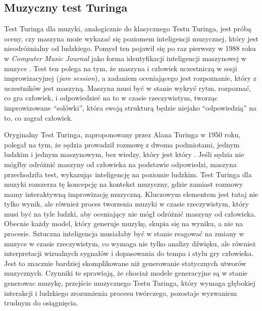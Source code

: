 \documentclass[data-science]{agh-wi} %
\begin{document}
\subsection{Muzyczny test Turinga}
Test Turinga dla muzyki, analogicznie do klasycznego Testu Turinga, jest próbą oceny, czy maszyna może wykazać się poziomem inteligencji muzycznej, który jest nieodróżnialny od ludzkiego. Pomysł ten pojawił się po raz pierwszy w 1988 roku w \textit{Computer Music Journal} jako forma identyfikacji inteligencji maszynowej w muzyce \cite{music_turing_test}. Test ten polega na tym, że maszyna i człowiek uczestniczą w sesji improwizacyjnej (\textit{jam session}), a zadaniem oceniającego jest rozpoznanie, który z uczestników jest maszyną. Maszyna musi być w stanie wykryć rytm, rozpoznać, co gra człowiek, i odpowiedzieć na to w czasie rzeczywistym, tworząc improwizowane ``solówki'', która swoją strukturą będzie niejako ``odpowiedzią'' na to, co zagrał człowiek.

Oryginalny Test Turinga, zaproponowany przez Alana Turinga w 1950 roku, polegał na tym, że sędzia prowadził rozmowę z dwoma podmiotami, jednym ludzkim i jednym maszynowym, bez wiedzy, który jest który \cite{turing_test}. Jeśli sędzia nie mógłby odróżnić maszyny od człowieka na podstawie odpowiedzi, maszyna przechodziła test, wykazując inteligencję na poziomie ludzkim. Test Turinga dla muzyki rozszerza tę koncepcję na kontekst muzyczny, gdzie zamiast rozmowy mamy interaktywną improwizację muzyczną. Kluczowym elementem jest tutaj nie tylko wynik, ale również proces tworzenia muzyki w czasie rzeczywistym, który musi być na tyle ludzki, aby oceniający nie mógł odróżnić maszyny od człowieka. Obecnie każdy model, który generuje muzykę, skupia się na wyniku, a nie na procesie. Sztuczna inteligencja musiałaby być w stanie reagować na zmiany w muzyce w czasie rzeczywistym, co wymaga nie tylko analizy dźwięku, ale również interpretacji wizualnych sygnałów i dopasowania do tempa i stylu gry człowieka. Jest to znacznie bardziej skomplikowane niż generowanie statycznych utworów muzycznych. Czynniki te sprawiają, że chociaż modele generacyjne są w stanie generowac muzykę, przejście muzycznego Testu Turinga, który wymaga głębokiej interakcji i ludzkiego zrozumienia procesu twórczego, pozostaje wyzwaniem trudnym do osiągnięcia.
\end{document}
